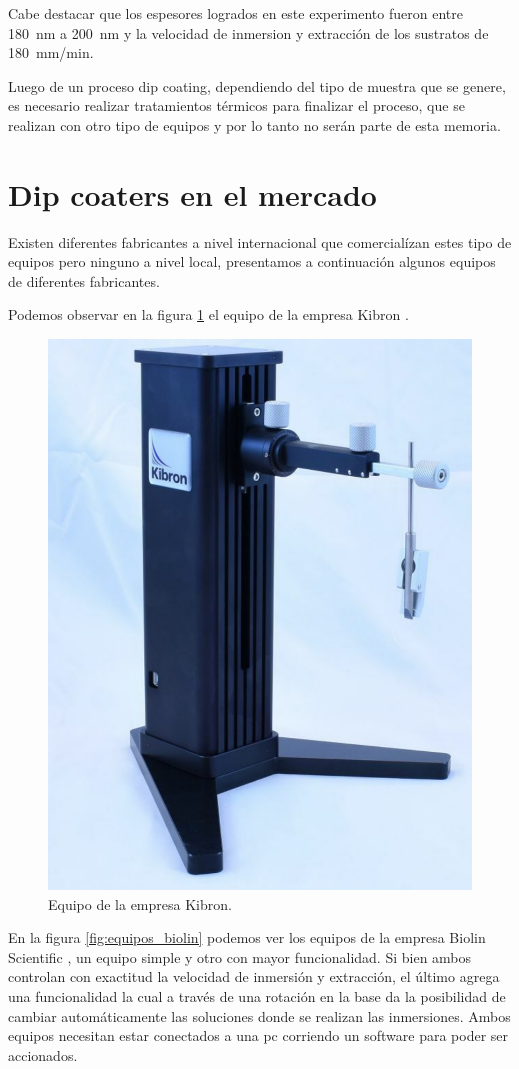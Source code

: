 

Cabe destacar que los espesores logrados en este experimento fueron entre \SI{180}{nm} a \SI{200}{nm} y la velocidad de inmersion y extracción de los sustratos de \SI{180}{mm/min}.

Luego de un proceso dip coating, dependiendo del tipo de muestra que se genere, es necesario realizar tratamientos térmicos para finalizar el proceso, que se realizan con otro tipo de equipos y por lo tanto no serán parte de esta memoria.
 


\section{Dip coaters en el mercado}

Existen diferentes fabricantes a nivel internacional que comercialízan estes tipo de equipos pero ninguno a nivel local, presentamos a continuación algunos equipos de diferentes fabricantes. 

Podemos observar en la figura \ref{fig:dip_kibron} el equipo de la empresa Kibron \citep{2_web_kibron}.

\begin{figure}[htbp]
	\centering
	\includegraphics[width=.25\textwidth]{./Figures/kibron.pdf}
	\caption{Equipo de la empresa Kibron.}
	\label{fig:dip_kibron}
\end{figure}

En la figura \ref{fig:equipos_biolin} podemos ver los equipos de la empresa Biolin Scientific  \citep{1_web_biolin}, un equipo simple y otro con mayor funcionalidad. Si bien ambos controlan con exactitud la velocidad de inmersión y extracción, el último agrega una funcionalidad la cual a través de una rotación en la base da la posibilidad de cambiar automáticamente las soluciones donde se realizan las inmersiones. Ambos equipos necesitan estar conectados a una pc corriendo un software para poder ser accionados.

